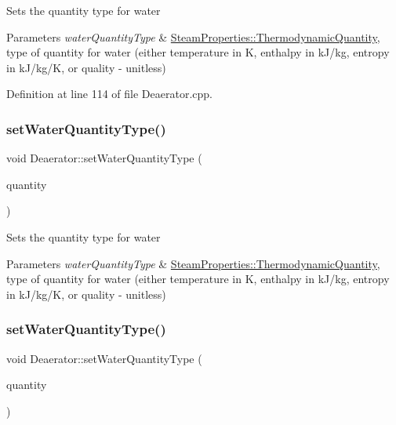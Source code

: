 Sets the quantity type for water 
\begin{DoxyParams}{Parameters}
{\em water\+Quantity\+Type} & \hyperlink{class_steam_properties_ae0294bedf7d178c2d8fb6aed0f62fbff}{Steam\+Properties\+::\+Thermodynamic\+Quantity}, type of quantity for water (either temperature in K, enthalpy in k\+J/kg, entropy in k\+J/kg/K, or quality -\/ unitless) \\
\hline
\end{DoxyParams}


Definition at line 114 of file Deaerator.\+cpp.

\mbox{\label{class_deaerator_ac60ad3d6650ed6c7783d18833bb7e3dd}} 
\subsubsection{\texorpdfstring{set\+Water\+Quantity\+Type()}{setWaterQuantityType()}\hspace{0.1cm}{\footnotesize\ttfamily [2/3]}}
{\footnotesize\ttfamily void Deaerator\+::set\+Water\+Quantity\+Type (\begin{DoxyParamCaption}\item[{\hyperlink{class_steam_properties_ae0294bedf7d178c2d8fb6aed0f62fbff}{Steam\+Properties\+::\+Thermodynamic\+Quantity}}]{quantity }\end{DoxyParamCaption})}

Sets the quantity type for water 
\begin{DoxyParams}{Parameters}
{\em water\+Quantity\+Type} & \hyperlink{class_steam_properties_ae0294bedf7d178c2d8fb6aed0f62fbff}{Steam\+Properties\+::\+Thermodynamic\+Quantity}, type of quantity for water (either temperature in K, enthalpy in k\+J/kg, entropy in k\+J/kg/K, or quality -\/ unitless) \\
\hline
\end{DoxyParams}
\mbox{\label{class_deaerator_ac60ad3d6650ed6c7783d18833bb7e3dd}} 
\subsubsection{\texorpdfstring{set\+Water\+Quantity\+Type()}{setWaterQuantityType()}\hspace{0.1cm}{\footnotesize\ttfamily [3/3]}}
{\footnotesize\ttfamily void Deaerator\+::set\+Water\+Quantity\+Type (\begin{DoxyParamCaption}\item[{\hyperlink{class_steam_properties_ae0294bedf7d178c2d8fb6aed0f62fbff}{Steam\+Properties\+::\+Thermodynamic\+Quantity}}]{quantity }\end{DoxyParamCaption})}

